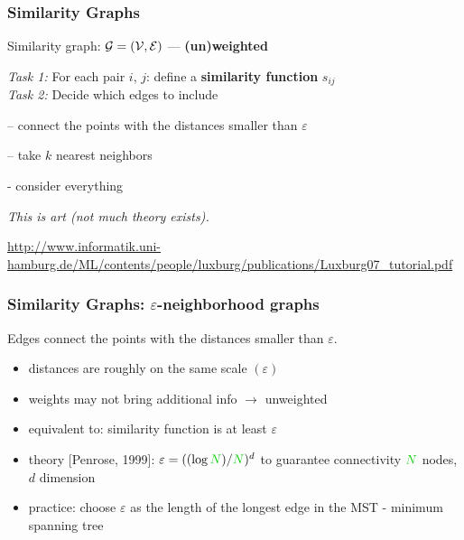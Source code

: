 \documentclass{beamer}
\begin{document}

\newcommand{\topictitle}{Similarity Graph Types}

\newcommand{\topicsubtitle}{ε-neighborhood, k-NN, Fully Connected}
\newcommand{\misoclasstinytitleslide}{Partially based on material by:  Andreas Krause, \\[-1em] Branislav Kveton, Michael Kearns}

\MakeTopicSlide

\begin{frame}
\frametitle{Similarity Graphs}

Similarity graph: $\mathcal{G} = (\mathcal{V}, \mathcal{E})$ ---  \textbf{(un)weighted}

\begin{block}{}
\emph{Task 1:} For each pair $i$, $j$: define a \textbf{similarity function} $s_{ij}$\\ \smallskip
\emph{Task 2:} Decide which edges to include
\end{block}
\pause
\begin{description}[<+-| alert@+>]
\item[$\varepsilon$-neighborhood graphs]  -- connect the points with the distances smaller than $\varepsilon$ 
\item[$k$-NN neighborhood graphs] -- take $k$ nearest neighbors 
\item[fully connected graphs] - consider everything 
\end{description}
\pause

\emph{This is art (not much theory exists).}

{\scriptsize 
\url{http://www.informatik.uni-hamburg.de/ML/contents/people/luxburg/publications/Luxburg07_tutorial.pdf}
}

\end{frame}
\begin{frame}
\frametitle{Similarity Graphs: $\varepsilon$-neighborhood graphs}

\begin{block}{}
Edges connect the points with the distances smaller than $\varepsilon$.
\end{block}
\pause
\begin{itemize}[<+-| alert@+>]%
\item distances are roughly on the same scale $(\varepsilon)$ 
\item weights may not bring additional info $\to$ unweighted
\item equivalent to: similarity function is at least $\varepsilon$
\item theory [Penrose, 1999]:  $\varepsilon = ((\log \nodes)/\nodes)^d$ to guarantee connectivity 
{\tiny $\nodes$ nodes, $d$ dimension} 
\item practice: choose $\varepsilon$ as the length of the longest edge in the MST - minimum spanning tree
\end{itemize}
\pause
{} 
\pause
{}


\end{frame}
\end{document}
